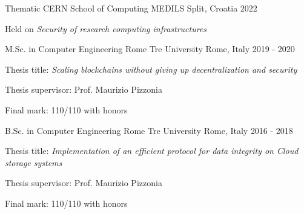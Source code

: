 

\begin{cventries}

  \cventry
    {Thematic CERN School of Computing} %
    {MEDILS} %
    {Split, Croatia} %
    {2022} %
    {
      \begin{cvitems} %
        \item {Held on \textit{Security of research computing infrastructures}}
      \end{cvitems}
    }
    
  \cventry
    {M.Sc. in Computer Engineering} %
    {Rome Tre University} %
    {Rome, Italy} %
    {2019 - 2020} %
    {
      \begin{cvitems} %
        \item {Thesis title: \textit{Scaling blockchains without giving up decentralization and security}}
        \item {Thesis supervisor: Prof. Maurizio Pizzonia}
        \item {Final mark: 110/110 with honors}
      \end{cvitems}
    }
    
  \cventry
    {B.Sc. in Computer Engineering} %
    {Rome Tre University} %
    {Rome, Italy} %
    {2016 - 2018} %
    {
      \begin{cvitems} %
        \item {Thesis title: \textit{Implementation of an efficient protocol for data integrity on Cloud storage systems}}
        \item {Thesis supervisor: Prof. Maurizio Pizzonia}
        \item {Final mark: 110/110 with honors}
      \end{cvitems}
    }
\end{cventries}
